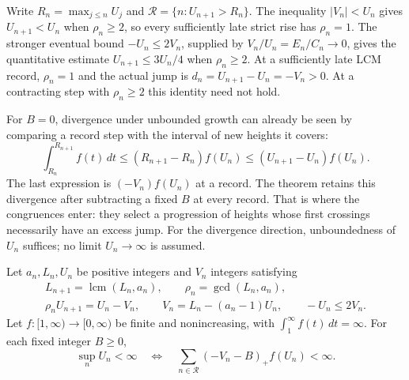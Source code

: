 \documentclass[11pt]{article}
\begin{document}
Write $R_n=\max_{j\le n}U_j$ and
$\mathcal R=\{n:U_{n+1}>R_n\}$.  The inequality $|V_n|<U_n$ gives
$U_{n+1}<U_n$ when $\rho_n\ge2$, so every sufficiently late strict rise has
$\rho_n=1$.  The stronger eventual bound $-U_n\le2V_n$, supplied by
$V_n/U_n=E_n/C_n\to0$, gives the quantitative estimate
$U_{n+1}\le3U_n/4$ when $\rho_n\ge2$.
At a sufficiently late LCM record, $\rho_n=1$ and the actual jump is
$d_n=U_{n+1}-U_n=-V_n>0$. At a contracting step with $\rho_n\ge2$ this
identity need not hold.

For $B=0$, divergence under unbounded growth can already be seen by
comparing a record step with the interval of new heights it covers:
\[
 \int_{R_n}^{R_{n+1}}f(t)\,dt
 \le (R_{n+1}-R_n)f(U_n)
 \le (U_{n+1}-U_n)f(U_n).
\]
The last expression is $(-V_n)f(U_n)$ at a record. The theorem retains
this divergence after subtracting a fixed $B$ at every record. That is
where the congruences enter: they select a progression of heights whose
first crossings necessarily have an excess jump. For the divergence direction, unboundedness of $U_n$ suffices; no
limit $U_n\to\infty$ is assumed.

\begin{theorem}\label{long243:res:arithmeticrecord}
Let $a_n,L_n,U_n$ be positive integers and $V_n$ integers satisfying
\[
 \begin{gathered}
 L_{n+1}=\operatorname{lcm}(L_n,a_n),\qquad \rho_n=\gcd(L_n,a_n),\\
 \rho_nU_{n+1}=U_n-V_n,\qquad
 V_n=L_n-(a_n-1)U_n,\qquad -U_n\le2V_n.
 \end{gathered}
\]
Let $f:[1,\infty)\to[0,\infty)$ be finite and nonincreasing, with
$\int_1^\infty f(t)\,dt=\infty$. For each fixed integer $B\ge0$,
\[
 \sup_n U_n<\infty
 \quad\Longleftrightarrow\quad
 \sum_{n\in\mathcal R}(-V_n-B)_+f(U_n)<\infty.
\]
\end{theorem}
\end{document}
